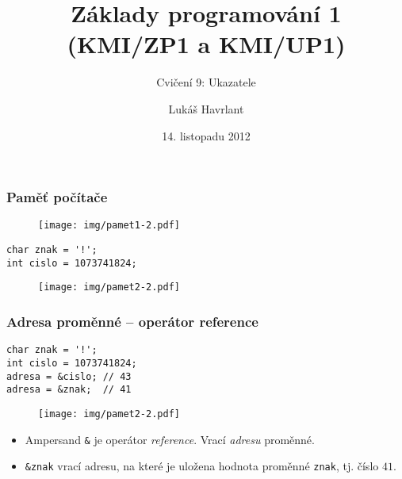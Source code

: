 \documentclass{beamer}
\title{Základy programování 1 (KMI/ZP1 a KMI/UP1)}
\subtitle{Cvičení 9: Ukazatele}
\author{Lukáš Havrlant}
\date{14. listopadu 2012}
\institute{Univerzita Palackého}
\newenvironment{itemizex}%
  {\large \begin{itemize}%
    \setlength{\itemsep}{8pt}%
    \setlength{\parskip}{8pt}}%
  {\end{itemize}}
\begin{document}
\begin{frame}[t,plain]
\titlepage
\end{frame}


\begin{frame}[t,fragile]\frametitle{Paměť počítače} 
    \begin{figure}[htb]
    \centering
    \texttt{[image: img/pamet1-2.pdf]}
    \end{figure}

    \begin{verbatim} 
char znak = '!';
int cislo = 1073741824;
    \end{verbatim}

    \begin{figure}[htb]
    \centering
    \texttt{[image: img/pamet2-2.pdf]}
    \end{figure}
\end{frame}


\begin{frame}[t,fragile]\frametitle{Adresa proměnné -- operátor reference} 
\begin{verbatim} 
char znak = '!';
int cislo = 1073741824; 
adresa = &cislo; // 43
adresa = &znak;  // 41
\end{verbatim}

\begin{figure}[htb]
    \centering
    \texttt{[image: img/pamet2-2.pdf]}
\end{figure}

\begin{itemizex}
    \item Ampersand \texttt{\&} je operátor \textit{reference}. Vrací \textit{adresu} proměnné.
    \item \texttt{\&znak} vrací adresu, na které je uložena hodnota proměnné \texttt{znak}, tj. číslo $41$.
\end{itemizex}
\end{frame}
\end{document}
